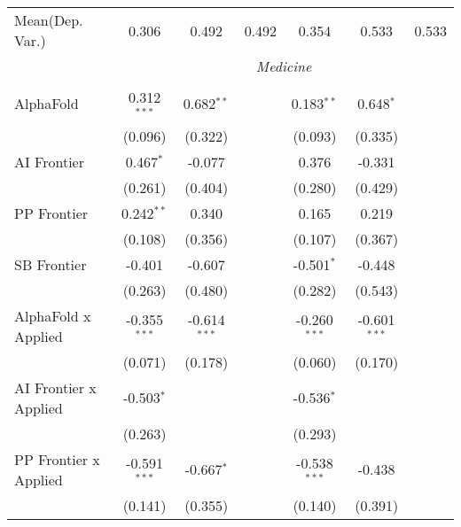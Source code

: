 \begin{tabular}{lcccccc}
Mean(Dep. Var.) & 0.306 & 0.492 & 0.492 & 0.354 & 0.533 & 0.533 \\
 & \multicolumn{6}{c}{\textit{Medicine}} \\ \\
   AlphaFold                      & 0.312$^{***}$  & 0.682$^{**}$   &                & 0.183$^{**}$   & 0.648$^{*}$    &   \\   
                                  & (0.096)        & (0.322)        &                & (0.093)        & (0.335)        &   \\   
   AI Frontier                    & 0.467$^{*}$    & -0.077         &                & 0.376          & -0.331         &   \\   
                                  & (0.261)        & (0.404)        &                & (0.280)        & (0.429)        &   \\   
   PP Frontier                    & 0.242$^{**}$   & 0.340          &                & 0.165          & 0.219          &   \\   
                                  & (0.108)        & (0.356)        &                & (0.107)        & (0.367)        &   \\   
   SB Frontier                    & -0.401         & -0.607         &                & -0.501$^{*}$   & -0.448         &   \\   
                                  & (0.263)        & (0.480)        &                & (0.282)        & (0.543)        &   \\   
   AlphaFold x Applied            & -0.355$^{***}$ & -0.614$^{***}$ &                & -0.260$^{***}$ & -0.601$^{***}$ &   \\   
                                  & (0.071)        & (0.178)        &                & (0.060)        & (0.170)        &   \\   
   AI Frontier x Applied          & -0.503$^{*}$   &                &                & -0.536$^{*}$   &                &   \\   
                                  & (0.263)        &                &                & (0.293)        &                &   \\   
   PP Frontier x Applied          & -0.591$^{***}$ & -0.667$^{*}$   &                & -0.538$^{***}$ & -0.438         &   \\   
                                  & (0.141)        & (0.355)        &                & (0.140)        & (0.391)        &   \\   

\end{tabular}
